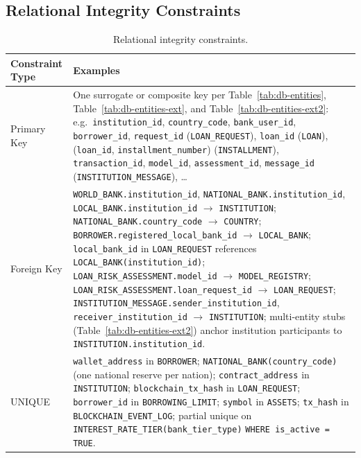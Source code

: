 \documentclass[12pt,a4paper]{report}
\newcommand{\tableheadcolor}{\rowcolor{TableHeadBg}}
\begin{document}
\subsection{Relational Integrity Constraints}
\label{sec:integrity-constraints}

\begin{table}[H]
\centering
\caption[Relational integrity constraints]{Relational integrity constraints.}
\label{tab:integrity-constraints}
\begin{tabular}{p{4cm}p{9.5cm}}
\toprule
\tableheadcolor
\textbf{Constraint Type} & \textbf{Examples} \\
\midrule
Primary Key & One surrogate or composite key per Table~\ref{tab:db-entities}, Table~\ref{tab:db-entities-ext}, and Table~\ref{tab:db-entities-ext2}: e.g.\ \texttt{institution\_id}, \texttt{country\_code}, \texttt{bank\_user\_id}, \texttt{borrower\_id}, \texttt{request\_id} (\texttt{LOAN\_REQUEST}), \texttt{loan\_id} (\texttt{LOAN}), (\texttt{loan\_id}, \texttt{installment\_number}) (\texttt{INSTALLMENT}), \texttt{transaction\_id}, \texttt{model\_id}, \texttt{assessment\_id}, \texttt{message\_id} (\texttt{INSTITUTION\_MESSAGE}), \ldots \\
Foreign Key & \texttt{WORLD\_BANK.institution\_id}, \texttt{NATIONAL\_BANK.institution\_id}, \texttt{LOCAL\_BANK.institution\_id} $\to$ \texttt{INSTITUTION}; \texttt{NATIONAL\_BANK.country\_code} $\to$ \texttt{COUNTRY}; \texttt{BORROWER.registered\_local\_bank\_id} $\to$ \texttt{LOCAL\_BANK}; \texttt{local\_bank\_id} in \texttt{LOAN\_REQUEST} references \texttt{LOCAL\_BANK(institution\_id)}; \texttt{LOAN\_RISK\_ASSESSMENT.model\_id} $\to$ \texttt{MODEL\_REGISTRY}; \texttt{LOAN\_RISK\_ASSESSMENT.loan\_request\_id} $\to$ \texttt{LOAN\_REQUEST}; \texttt{INSTITUTION\_MESSAGE.sender\_institution\_id}, \texttt{receiver\_institution\_id} $\to$ \texttt{INSTITUTION}; multi-entity stubs (Table~\ref{tab:db-entities-ext2}) anchor institution participants to \texttt{INSTITUTION.institution\_id}. \\
UNIQUE & \texttt{wallet\_address} in \texttt{BORROWER}; \texttt{NATIONAL\_BANK(country\_code)} (one national reserve per nation); \texttt{contract\_address} in \texttt{INSTITUTION}; \texttt{blockchain\_tx\_hash} in \texttt{LOAN\_REQUEST}; \texttt{borrower\_id} in \texttt{BORROWING\_LIMIT}; \texttt{symbol} in \texttt{ASSETS}; \texttt{tx\_hash} in \texttt{BLOCKCHAIN\_EVENT\_LOG}; partial unique on \texttt{INTEREST\_RATE\_TIER(bank\_tier\_type)} \texttt{WHERE is\_active = TRUE}. \\

\end{tabular}
\end{table}
\end{document}
